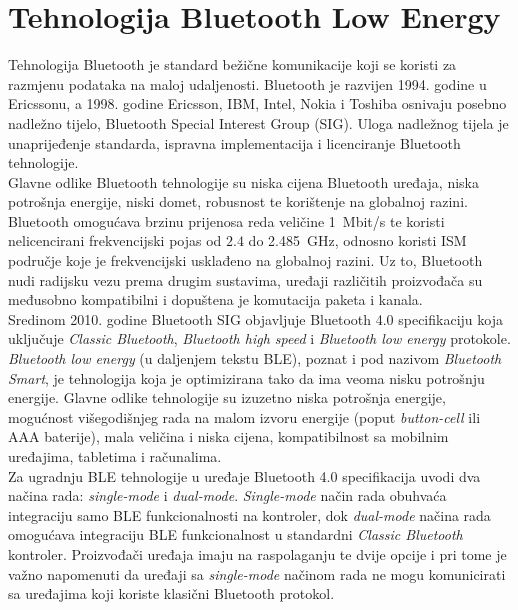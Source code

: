 \chapter{Tehnologija Bluetooth Low Energy}

Tehnologija Bluetooth je standard bežične komunikacije koji se koristi za razmjenu podataka na maloj udaljenosti. 
Bluetooth je razvijen 1994. godine u Ericssonu, a 1998. godine Ericsson, IBM, Intel, Nokia i Toshiba osnivaju posebno nadležno tijelo, Bluetooth Special Interest Group (SIG). 
Uloga nadležnog tijela je unaprijeđenje standarda, ispravna implementacija i licenciranje Bluetooth tehnologije.
\\

Glavne odlike Bluetooth tehnologije su niska cijena Bluetooth uređaja, niska potrošnja energije, niski domet, robusnost te korištenje na globalnoj razini. 
Bluetooth omogućava brzinu prijenosa reda veličine \SI{1}{Mbit/s} te koristi nelicencirani frekvencijski pojas od $2.4$ do \SI{2.485}{GHz}, odnosno koristi ISM područje  koje je frekvencijski usklađeno na globalnoj razini. 
Uz to, Bluetooth nudi radijsku vezu prema drugim sustavima, uređaji različitih proizvođača su međusobno kompatibilni i dopuštena je komutacija paketa i kanala.
\\

Sredinom 2010. godine Bluetooth SIG objavljuje Bluetooth 4.0 specifikaciju koja uključuje \textit{Classic Bluetooth}, \textit{Bluetooth high speed} i \textit{Bluetooth low energy} protokole.
\\
\textit{Bluetooth low energy} (u daljenjem tekstu BLE), poznat i pod nazivom \textit{Bluetooth Smart}, je tehnologija koja je optimizirana tako da ima veoma nisku potrošnju energije. 
Glavne odlike tehnologije su izuzetno niska potrošnja energije, mogućnost višegodišnjeg rada na malom izvoru energije (poput \textit{button-cell} ili AAA baterije), mala veličina i niska cijena, kompatibilnost sa mobilnim uređajima, tabletima i računalima. 
\\
Za ugradnju BLE tehnologije u uređaje Bluetooth 4.0 specifikacija uvodi dva načina rada: \textit{single-mode} i \textit{dual-mode}. 
\textit{Single-mode} način rada obuhvaća integraciju samo BLE funkcionalnosti na kontroler, dok \textit{dual-mode} načina rada omogućava integraciju BLE funkcionalnost u standardni \textit{Classic Bluetooth} kontroler. 
Proizvođači uređaja imaju na raspolaganju te dvije opcije i pri tome je važno napomenuti da uređaji sa \textit{single-mode} načinom rada ne mogu komunicirati sa uređajima koji koriste klasični Bluetooth protokol.
\\

